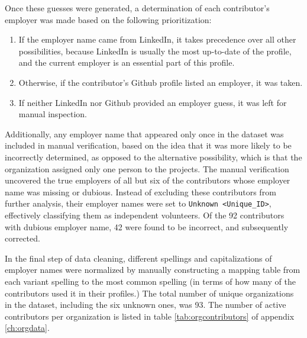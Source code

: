 Once these guesses were generated, a determination of each contributor's employer was made based on the following prioritization:
\begin{enumerate}
	\item If the employer name came from LinkedIn, it takes precedence over all other possibilities, because LinkedIn is usually the most up-to-date of the profile, and the current employer is an essential part of this profile.
	\item Otherwise, if the contributor's Github profile listed an employer, it was taken.
	\item If neither LinkedIn nor Github provided an employer guess, it was left for manual inspection.
\end{enumerate}
Additionally, any employer name that appeared only once in the dataset was included in manual verification, based on the idea that it was more likely to be incorrectly determined, as opposed to the alternative possibility, which is that the organization assigned only one person to the projects.
The manual verification uncovered the true employers of all but six of the contributors whose employer name was missing or dubious. Instead of excluding these contributors from further analysis, their employer names were set to \verb|Unknown <Unique_ID>|, effectively classifying them as independent volunteers. Of the 92 contributors with dubious employer name, 42 were found to be incorrect, and subsequently corrected.

In the final step of data cleaning, different spellings and capitalizations of employer names were normalized by manually constructing a mapping table from each variant spelling to the most common spelling (in terms of how many of the contributors used it in their profiles.) The total number of unique organizations in the dataset, including the six unknown ones, was 93. The number of active contributors per organization is listed in table \ref{tab:orgcontributors} of appendix \ref{ch:orgdata}.